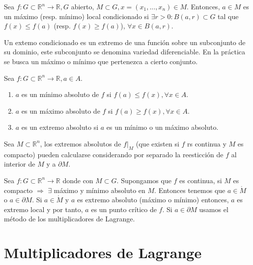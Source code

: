 \begin{defn}
Sea $f:G\subset\mathbb{R}^n\rightarrow\mathbb{R}, G $ abierto, $M\subset G, x=(x_1,...,x_n) \in M$. Entonces, $a\in M$ es un máximo (resp. mínimo) local condicionado si $\exists r>0:B(a,r)\subset G$ tal que $f(x) \leq f(a)$ (resp. $f(x) \geq f(a)$), $\forall x\in B(a,r)$.
\end{defn}

\begin{obs}
Un extemo condicionado es un extremo de una función sobre un subconjunto de su dominio, este subconjunto se denomina variedad diferenciable. En la práctica se busca un máximo o mínimo que pertenezca a cierto conjunto.
\end{obs}

\begin{defn}
Sea $f:G\subset\mathbb{R}^n\rightarrow\mathbb{R}, a\in A$.
\begin{enumerate}[label=(\roman*)]
    \item $a$ es un mínimo absoluto de $f$ si $f(a)\leq f(x), \forall x \in A$.
    \item $a$ es un máximo absoluto de $f$ si $f(a)\geq f(x), \forall x \in A$. 
    \item $a$ es un extremo absoluto si $a$ es un mínimo o un máximo absoluto.
\end{enumerate}
\end{defn}

\begin{obs}
Sea $M\subset\mathbb{R}^n$, los extremos absolutos de $\left.f\right|_M$ (que existen si $f$ rs continua y $M$ es compacto) pueden calcularse considerando por separado la reesticción de $f$ al interior de $M$ y a $\partial M$.
\end{obs}

\begin{obs}
Sea $f:G\subset\mathbb{R}^n\rightarrow\mathbb{R}$ donde con $ M \subset G$. Supongamos que $f$ es continua, si $M$ es compacto $\Rightarrow$ $\exists$ máximo y mínimo absoluto en $M$. Entonces tenemos que $a\in\mathring{M}$ o $a\in\partial M$. Si $a\in\mathring{M}$ y $a$ es extremo absoluto (máximo o mínimo) entonces, $a$ es extremo local y por tanto, $a$ es un punto crítico de $f$. Si $a\in\partial M$ usamos el método de los multiplicadores de Lagrange.
\end{obs}

\section{Multiplicadores de Lagrange}


